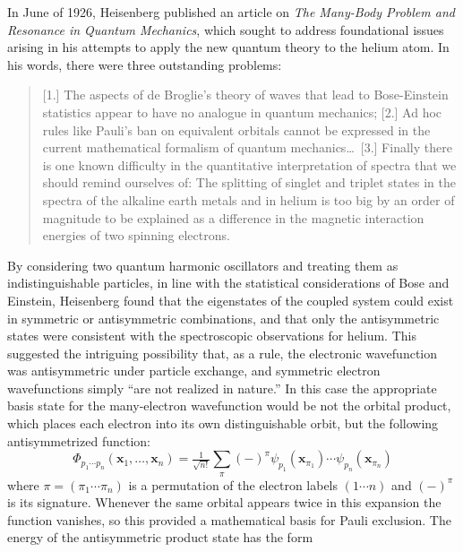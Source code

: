 In June of 1926, Heisenberg published an article on {\itshape The Many-Body
Problem and Resonance in Quantum Mechanics}, which sought to address
foundational issues arising in his attempts to apply the new quantum theory to
the helium atom.
In his words, there were three outstanding problems:
\begin{quote}
    [1.] The aspects of de Broglie's theory of waves that lead to Bose-Einstein
    statistics appear to have no analogue in quantum mechanics;
    [2.] Ad hoc rules like Pauli's ban on equivalent orbitals cannot be
    expressed in the current mathematical formalism of quantum mechanics\dots\ 
    [3.] Finally there is one known difficulty in the quantitative
    interpretation of spectra that we should remind ourselves of:
    The splitting of singlet and triplet states in the spectra of the alkaline
    earth metals and in helium is too big by an order of magnitude to be
    explained as a difference in the magnetic interaction energies of two
    spinning electrons.\cite{Heisenberg:1926p411}
\end{quote}
By considering two quantum harmonic oscillators and treating them as
indistinguishable particles, in line with the statistical considerations of Bose
and Einstein,\cite{Bose:1924p178,Einstein:1924p261,Einstein:1925p3} Heisenberg
found that the eigenstates of the coupled system could exist in symmetric or
antisymmetric combinations, and that only the antisymmetric states were
consistent with the spectroscopic observations for helium.
This suggested the intriguing possibility that, as a rule, the electronic
wavefunction was antisymmetric under particle exchange, and symmetric electron
wavefunctions simply ``are not realized in nature.''\cite{Heisenberg:1926p411}
In this case the appropriate basis state for the many-electron wavefunction
would be not the orbital product, which places each electron into its own
distinguishable orbit, but the following antisymmetrized function:
\begin{equation}
    \Phi_{p_1\cdots p_n}(\mathbf{x}_1, \ldots, \mathbf{x}_n)
    =
    \tfrac{1}{\sqrt{n!}}
    \sum_\pi
    (-)^\pi
    \psi_{p_1}(\mathbf{x}_{\pi_1})
    \cdots
    \psi_{p_n}(\mathbf{x}_{\pi_n})
\end{equation}
where \(\pi=(\pi_1\cdots \pi_n)\) is a permutation of the electron labels
\((1\cdots n)\) and \((-)^\pi\) is its signature.
Whenever the same orbital appears twice in this expansion the function vanishes,
so this provided a mathematical basis for Pauli exclusion.
The energy of the antisymmetric product state has the form
